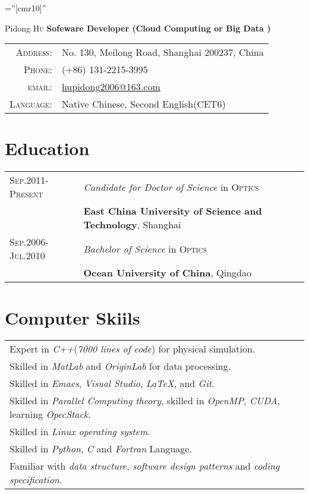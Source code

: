 \documentclass[a4paper,11pt]{article}
\begin{document}

\pagestyle{empty} %

\font\fb=''[cmr10]'' %

\par{
		{\Huge Pidong \textsc{Hu} } \textbf{Sofeware Developer (Cloud Computing or Big Data )} 

\begin{tabular}{rl}
    \textsc{Address:}   & No. 130, Meilong Road, Shanghai 200237, China \\
    \textsc{Phone:}     & (+86) 131-2215-3995 \\
    \textsc{email:}     & \href{hupidong2006@163.com}{hupidong2006@163.com}\\
    \textsc{Language:}	&Native Chinese, Second English(CET6)
\end{tabular}
\section{Education}
\begin{tabular}{ll}	
\textsc{Sep.2011-Present} &\emph{ Candidate for Doctor of Science} in \textsc{Optics}\\
&\normalsize\textbf{East China University of Science and Technology}, Shanghai\\
\textsc{Sep.2006-Jul.2010} &\emph{ Bachelor of Science} in \textsc{Optics} \\
&\normalsize\textbf{Ocean University of China}, Qingdao\\
\end{tabular}
\section{Computer Skiils}
\begin{tabular}{l}	
Expert in \emph{C++}(\emph{7000 lines of code}) for physical simulation.\\
Skilled in \emph{MatLab} and \emph{OriginLab} for data processing.\\
Skilled in \emph{Emacs}, \emph{Visual Studio}, \emph{\LaTeX{}}, and \emph{Git}.\\
Skilled in \emph{Parallel Computing theory}, skilled in \emph{OpenMP}, \emph{CUDA}, learning \emph{OpecStack}.\\
Skilled in \emph{Linux operating system}.\\
Skilled in \emph{Python}, \emph{C} and \emph{Fortran} Language.\\
Familiar with \emph{data structure}, \emph{software design patterns} and \emph{coding specification}.
\end{tabular}
}
\end{document}
